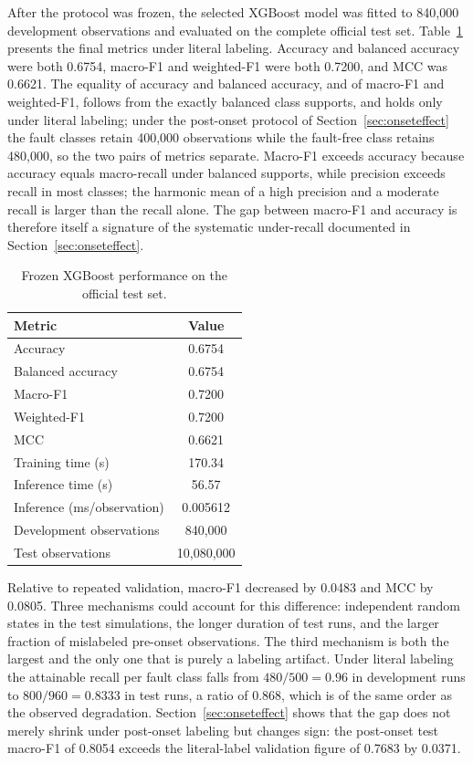 \documentclass[10pt,twocolumn,a4paper]{article}
\begin{document}
After the protocol was frozen, the selected XGBoost model was fitted to 840,000
development observations and evaluated on the complete official test set.
Table~\ref{tab:test} presents the final metrics under literal labeling.
Accuracy and balanced accuracy were both 0.6754, macro-F1 and weighted-F1 were
both 0.7200, and MCC was 0.6621. The equality of accuracy and balanced
accuracy, and of macro-F1 and weighted-F1, follows from the exactly balanced
class supports, and holds only under literal labeling; under the post-onset
protocol of Section~\ref{sec:onseteffect} the fault classes retain 400,000
observations while the fault-free class retains 480,000, so the two pairs of
metrics separate. Macro-F1 exceeds accuracy because accuracy equals macro-recall
under balanced supports, while precision exceeds recall in most classes; the
harmonic mean of a high precision and a moderate recall is larger than the
recall alone. The gap between macro-F1 and accuracy is therefore itself a
signature of the systematic under-recall documented in
Section~\ref{sec:onseteffect}.

\begin{table}[H]
\centering
\caption{Frozen XGBoost performance on the official test set.}
\label{tab:test}
\small
\begin{tabular}{lc}
\toprule
Metric & Value\\
\midrule
Accuracy & 0.6754\\
Balanced accuracy & 0.6754\\
Macro-F1 & 0.7200\\
Weighted-F1 & 0.7200\\
MCC & 0.6621\\
Training time (s) & 170.34\\
Inference time (s) & 56.57\\
Inference (ms/observation) & 0.005612\\
Development observations & 840,000\\
Test observations & 10,080,000\\
\bottomrule
\end{tabular}
\end{table}

Relative to repeated validation, macro-F1 decreased by 0.0483 and MCC by
0.0805. Three mechanisms could account for this difference: independent random
states in the test simulations, the longer duration of test runs, and the
larger fraction of mislabeled pre-onset observations. The third mechanism is
both the largest and the only one that is purely a labeling artifact. Under
literal labeling the attainable recall per fault class falls from $480/500=0.96$
in development runs to $800/960=0.8333$ in test runs, a ratio of 0.868, which
is of the same order as the observed degradation. Section~\ref{sec:onseteffect}
shows that the gap does not merely shrink under post-onset labeling but changes
sign: the post-onset test macro-F1 of 0.8054 exceeds the literal-label
validation figure of 0.7683 by 0.0371.
\end{document}
